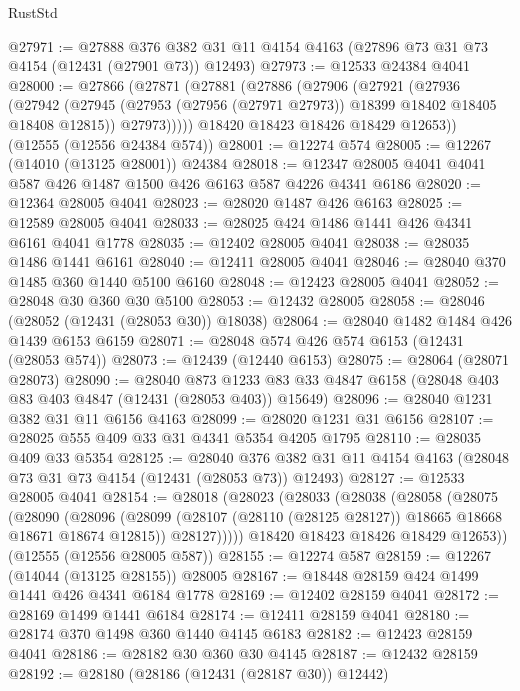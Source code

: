 \begin{lexlean}{RustStd}
\begin{coremodule}
@27971 := @27888
    @376
    @382
    @31
    @11
    @4154
    @4163
    (@27896 @73 @31 @73 @4154 (@12431 (@27901 @73)) @12493)
@27973 := @12533 @24384 @4041
@28000 := @27866
    (@27871
      (@27881
        (@27886
          (@27906
            (@27921
              (@27936
                (@27942
                  (@27945 (@27953 (@27956 (@27971 @27973)) @18399 @18402 @18405 @18408 @12815))
                  @27973)))))
        @18420
        @18423
        @18426
        @18429
        @12653))
    (@12555 (@12556 @24384 @574))
@28001 := @12274 @574
@28005 := @12267 (@14010 (@13125 @28001)) @24384
@28018 := @12347 @28005 @4041 @4041 @587 @426 @1487 @1500 @426 @6163 @587 @4226 @4341 @6186
@28020 := @12364 @28005 @4041
@28023 := @28020 @1487 @426 @6163
@28025 := @12589 @28005 @4041
@28033 := @28025 @424 @1486 @1441 @426 @4341 @6161 @4041 @1778
@28035 := @12402 @28005 @4041
@28038 := @28035 @1486 @1441 @6161
@28040 := @12411 @28005 @4041
@28046 := @28040 @370 @1485 @360 @1440 @5100 @6160
@28048 := @12423 @28005 @4041
@28052 := @28048 @30 @360 @30 @5100
@28053 := @12432 @28005
@28058 := @28046 (@28052 (@12431 (@28053 @30)) @18038)
@28064 := @28040 @1482 @1484 @426 @1439 @6153 @6159
@28071 := @28048 @574 @426 @574 @6153 (@12431 (@28053 @574))
@28073 := @12439 (@12440 @6153)
@28075 := @28064 (@28071 @28073)
@28090 := @28040
    @873
    @1233
    @83
    @33
    @4847
    @6158
    (@28048 @403 @83 @403 @4847 (@12431 (@28053 @403)) @15649)
@28096 := @28040 @1231 @382 @31 @11 @6156 @4163
@28099 := @28020 @1231 @31 @6156
@28107 := @28025 @555 @409 @33 @31 @4341 @5354 @4205 @1795
@28110 := @28035 @409 @33 @5354
@28125 := @28040
    @376
    @382
    @31
    @11
    @4154
    @4163
    (@28048 @73 @31 @73 @4154 (@12431 (@28053 @73)) @12493)
@28127 := @12533 @28005 @4041
@28154 := @28018
    (@28023
      (@28033
        (@28038
          (@28058
            (@28075
              (@28090
                (@28096
                  (@28099 (@28107 (@28110 (@28125 @28127)) @18665 @18668 @18671 @18674 @12815))
                  @28127)))))
        @18420
        @18423
        @18426
        @18429
        @12653))
    (@12555 (@12556 @28005 @587))
@28155 := @12274 @587
@28159 := @12267 (@14044 (@13125 @28155)) @28005
@28167 := @18448 @28159 @424 @1499 @1441 @426 @4341 @6184 @1778
@28169 := @12402 @28159 @4041
@28172 := @28169 @1499 @1441 @6184
@28174 := @12411 @28159 @4041
@28180 := @28174 @370 @1498 @360 @1440 @4145 @6183
@28182 := @12423 @28159 @4041
@28186 := @28182 @30 @360 @30 @4145
@28187 := @12432 @28159
@28192 := @28180 (@28186 (@12431 (@28187 @30)) @12442)

\end{coremodule}
\end{lexlean}
